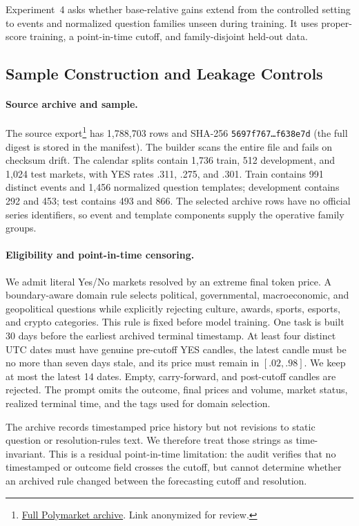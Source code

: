 Experiment~4 asks whether base-relative gains extend from the controlled setting
to events and normalized question families unseen during training. It uses
proper-score training, a point-in-time cutoff, and family-disjoint held-out data.

\subsection{Sample Construction and Leakage Controls}

\paragraph{Source archive and sample.}
The source export\footnote{%
  \;%
  \href{https://huggingface.co/datasets/anonymous-review/polymarket-full-market-data}%
  {Full Polymarket archive}. Link anonymized for review.%
} has 1,788,703 rows and SHA-256
\texttt{5697f767\ldots f638e7d} (the full digest is stored in the manifest).
The builder scans the entire file and fails on checksum drift. The calendar
splits contain 1,736 train, 512 development, and 1,024 test markets, with YES rates
.311, .275, and .301. Train contains 991 distinct events and 1,456 normalized
question templates; development contains 292 and 453; test contains 493 and 866.
The selected archive rows have no official series identifiers, so event and
template components supply the operative family groups.

\paragraph{Eligibility and point-in-time censoring.}
We admit literal Yes/No markets resolved by an extreme final token price. A
boundary-aware domain rule selects political, governmental, macroeconomic, and
geopolitical questions while explicitly rejecting culture, awards, sports,
esports, and crypto categories. This rule is fixed before model training. One task
is built 30 days before the earliest archived terminal timestamp. At least four
distinct UTC dates must have genuine pre-cutoff YES candles, the latest candle must
be no more than seven days stale, and its price must remain in $[.02,.98]$. We keep
at most the latest 14 dates. Empty, carry-forward, and post-cutoff candles are
rejected. The prompt omits the outcome, final prices and volume, market status,
realized terminal time, and the tags used for domain selection.

The archive records timestamped price history but not revisions to static question
or resolution-rules text. We therefore treat those strings as time-invariant. This
is a residual point-in-time limitation: the audit verifies that no timestamped or
outcome field crosses the cutoff, but cannot determine whether an archived rule
changed between the forecasting cutoff and resolution.

